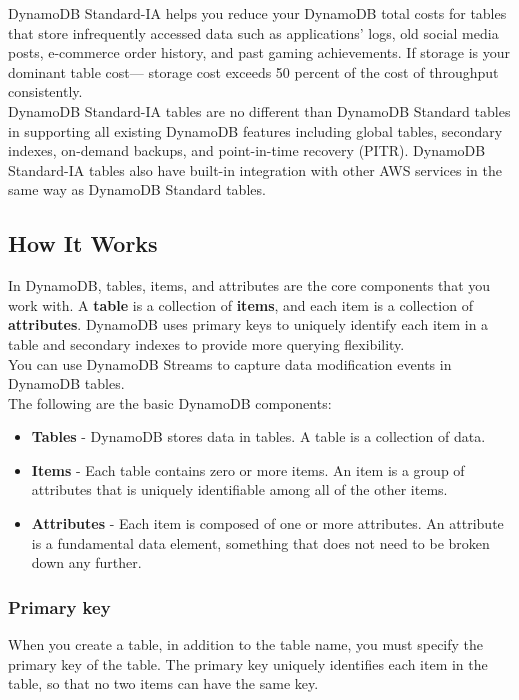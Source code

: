 \documentclass[12pt, letterpaper, twoside]{article}
\begin{document}
DynamoDB Standard-IA helps you reduce your DynamoDB total costs for tables that store infrequently accessed data such 
as applications’ logs, old social media posts, e-commerce order history, and past gaming achievements. 
If storage is your dominant table cost— storage cost exceeds 50 percent of the cost of throughput consistently.\\

DynamoDB Standard-IA tables are no different than DynamoDB Standard tables in supporting all existing DynamoDB 
features including global tables, secondary indexes, on-demand backups, and point-in-time recovery (PITR). 
DynamoDB Standard-IA tables also have built-in integration with other AWS services in the same way as DynamoDB 
Standard tables.\\

\subsection{How It Works}
In DynamoDB, tables, items, and attributes are the core components that you work with. A \textbf{table} is a 
collection of \textbf{items}, and each item is a collection of \textbf{attributes}. DynamoDB uses primary keys 
to uniquely identify each item in a table and secondary indexes to provide more querying flexibility.\\
You can use DynamoDB Streams to capture data modification events in DynamoDB tables.\\

The following are the basic DynamoDB components:
\begin{itemize}
	\item \textbf{Tables} - DynamoDB stores data in tables. A table is a collection of data.
	\item \textbf{Items} - Each table contains zero or more items. An item is a group of attributes that is uniquely 
		identifiable among all of the other items.
	\item \textbf{Attributes} - Each item is composed of one or more attributes. An attribute is a fundamental data 
		element, something that does not need to be broken down any further. 
\end{itemize}

\subsubsection{Primary key}
When you create a table, in addition to the table name, you must specify the primary key of the table. The primary 
key uniquely identifies each item in the table, so that no two items can have the same key.\\
\end{document}
